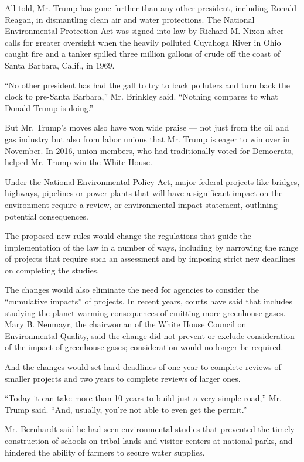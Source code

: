 All told, Mr. Trump has gone further than any other president, including
Ronald Reagan, in dismantling clean air and water protections. The
National Environmental Protection Act was signed into law by Richard M.
Nixon after calls for greater oversight when the heavily polluted
Cuyahoga River in Ohio caught fire and a tanker spilled three million
gallons of crude off the coast of Santa Barbara, Calif., in 1969.

``No other president has had the gall to try to back polluters and turn
back the clock to pre-Santa Barbara,'' Mr. Brinkley said. ``Nothing
compares to what Donald Trump is doing.''

But Mr. Trump's moves also have won wide praise --- not just from the
oil and gas industry but also from labor unions that Mr. Trump is eager
to win over in November. In 2016, union members, who had traditionally
voted for Democrats, helped Mr. Trump win the White House.

Under the National Environmental Policy Act, major federal projects like
bridges, highways, pipelines or power plants that will have a
significant impact on the environment require a review, or environmental
impact statement, outlining potential consequences.

The proposed new rules would change the regulations that guide the
implementation of the law in a number of ways, including by narrowing
the range of projects that require such an assessment and by imposing
strict new deadlines on completing the studies.

The changes would also eliminate the need for agencies to consider the
``cumulative impacts'' of projects. In recent years, courts have said
that includes studying the planet-warming consequences of emitting more
greenhouse gases. Mary B. Neumayr, the chairwoman of the White House
Council on Environmental Quality, said the change did not prevent or
exclude consideration of the impact of greenhouse gases; consideration
would no longer be required.

And the changes would set hard deadlines of one year to complete reviews
of smaller projects and two years to complete reviews of larger ones.

``Today it can take more than 10 years to build just a very simple
road,'' Mr. Trump said. ``And, usually, you're not able to even get the
permit.''

Mr. Bernhardt said he had seen environmental studies that prevented the
timely construction of schools on tribal lands and visitor centers at
national parks, and hindered the ability of farmers to secure water
supplies.

